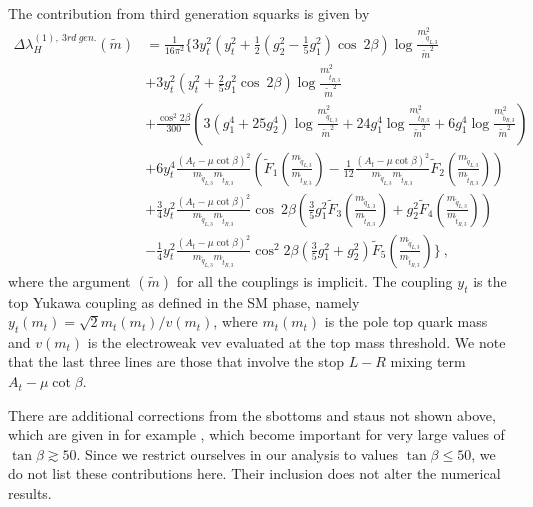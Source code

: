 \documentclass[12pt]{article}
\newcommand{\sq}{\tilde{q}}
\newcommand{\mStL}{m_{\sq_{L,3}}}
\newcommand{\mStR}{m_{\tilde{t}_{R,3}}}
\newcommand{\mSbR}{m_{\tilde{b}_{R,3}}}
\newcommand{\mS}{\tilde{m}}
\begin{document}
The contribution from third generation squarks is given by
\begin{align}
\nonumber \Delta\lambda_H^{(1),~3rd~gen.}(\mS) &= \frac{1}{16\pi^2} \Bigg\{ 3y_t^2 \left( y_t^2 + \frac{1}{2} \left(g_2^2-\frac{1}{5}g_1^2 \right) \cos~ 2 \beta\right) \log\frac{\mStL^2}{\mS^2} 
\\ \nonumber &+ 3 y_t^2 \left( y_t^2 + \frac{2}{5} g_1^2 \cos~2\beta \right)\log\frac{\mStR^2}{\mS^2} 
\\ \nonumber &+\frac{\cos^2 2\beta}{300} \left( 3(g_1^4 + 25 g_2^4) \log \frac{\mStL^2}{\mS^2} + 24 g_1^4 \log \frac{\mStR^2}{\mS^2} + 6 g_1^4 \log\frac{\mSbR^2}{\mS^2}\right) 
\\ \nonumber&+ 6 y_t^4 \frac{(A_t-\mu \cot \beta)^2}{\mStL \mStR} \left( \tilde{F}_1\left(\frac{\mStL}{\mStR}\right)-\frac{1}{12}\frac{(A_t-\mu \cot \beta)^2}{\mStL \mStR} \tilde{F}_2\left(\frac{\mStL}{\mStR} \right)\right) 
\\ \nonumber &+ \frac{3}{4}y_t^2 \frac{(A_t-\mu \cot \beta)^2}{\mStL \mStR} \cos~2\beta \left( \frac{3}{5} g_1^2 \tilde{F}_3\left(\frac{\mStL}{\mStR} \right) + g_2^2 \tilde{F}_4\left(\frac{\mStL}{\mStR} \right)\right) 
\\ & - \frac{1}{4}y_t^2 \frac{(A_t-\mu \cot \beta)^2}{\mStL \mStR} \cos^2 2 \beta \left( \frac{3}{5} g_1^2 + g_2^2\right)\tilde{F}_5\left(\frac{\mStL}{\mStR} \right) \Bigg\}\ ,
\label{ThirdGenPart.EQ}
\end{align}
where the argument $(\mS)$ for all the couplings is implicit. The coupling $y_t$ is the top Yukawa coupling as defined in the SM phase, namely $y_t (m_t) = \sqrt{2}m_t(m_t) /v(m_t)$, where $m_t(m_t)$ is the pole top quark mass and $v(m_t)$ is the electroweak vev evaluated at the top mass threshold. We note that the last three lines are those that involve the stop $L-R$ mixing term $A_t - \mu \cot \beta$.

There are additional corrections from the sbottoms and staus not shown above, which are given in for example \cite{Lee:2015uza, Vega:2015fna}, which become important for very large values of $\tan\beta \gtrsim 50$. Since we restrict ourselves in our analysis to values $\tan\beta \leq 50$, we do not list these contributions here. Their inclusion does not alter the numerical results.
\end{document}
